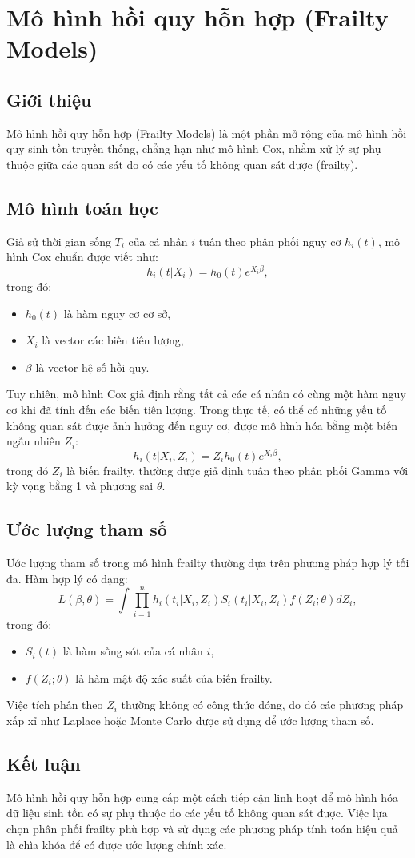 \chapter{Mô hình hồi quy hỗn hợp (Frailty Models)}
\section{Giới thiệu}
Mô hình hồi quy hỗn hợp (Frailty Models) là một phần mở rộng của mô hình hồi quy sinh tồn truyền thống, chẳng hạn như mô hình Cox, nhằm xử lý sự phụ thuộc giữa các quan sát do có các yếu tố không quan sát được (frailty).

\section{Mô hình toán học}
Giả sử thời gian sống $T_i$ của cá nhân $i$ tuân theo phân phối nguy cơ $h_i(t)$, mô hình Cox chuẩn được viết như:
\begin{equation}
    h_i(t | X_i) = h_0(t) e^{X_i \beta},
\end{equation}
trong đó:
\begin{itemize}
    \item $h_0(t)$ là hàm nguy cơ cơ sở,
    \item $X_i$ là vector các biến tiên lượng,
    \item $\beta$ là vector hệ số hồi quy.
\end{itemize}

Tuy nhiên, mô hình Cox giả định rằng tất cả các cá nhân có cùng một hàm nguy cơ khi đã tính đến các biến tiên lượng. Trong thực tế, có thể có những yếu tố không quan sát được ảnh hưởng đến nguy cơ, được mô hình hóa bằng một biến ngẫu nhiên $Z_i$:
\begin{equation}
    h_i(t | X_i, Z_i) = Z_i h_0(t) e^{X_i \beta},
\end{equation}
trong đó $Z_i$ là biến frailty, thường được giả định tuân theo phân phối Gamma với kỳ vọng bằng 1 và phương sai $\theta$.

\section{Ước lượng tham số}
Ước lượng tham số trong mô hình frailty thường dựa trên phương pháp hợp lý tối đa. Hàm hợp lý có dạng:
\begin{equation}
    L(\beta, \theta) = \int \prod_{i=1}^{n} h_i(t_i | X_i, Z_i) S_i(t_i | X_i, Z_i) f(Z_i; \theta) dZ_i,
\end{equation}
trong đó:
\begin{itemize}
    \item $S_i(t)$ là hàm sống sót của cá nhân $i$,
    \item $f(Z_i; \theta)$ là hàm mật độ xác suất của biến frailty.
\end{itemize}
Việc tích phân theo $Z_i$ thường không có công thức đóng, do đó các phương pháp xấp xỉ như Laplace hoặc Monte Carlo được sử dụng để ước lượng tham số.

\section{Kết luận}
Mô hình hồi quy hỗn hợp cung cấp một cách tiếp cận linh hoạt để mô hình hóa dữ liệu sinh tồn có sự phụ thuộc do các yếu tố không quan sát được. Việc lựa chọn phân phối frailty phù hợp và sử dụng các phương pháp tính toán hiệu quả là chìa khóa để có được ước lượng chính xác.
